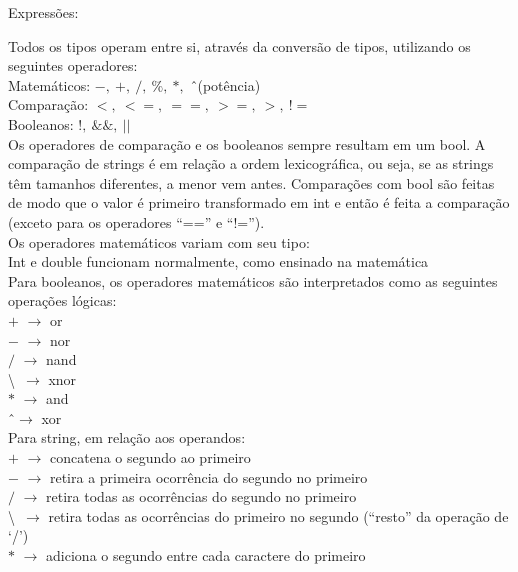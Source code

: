 \documentclass[12pt,a4paper]{article}
\begin{document}
\large{Expressões:}\\[0.1cm]
\normalsize

Todos os tipos operam entre si, através da conversão de tipos, utilizando os seguintes operadores:\\[0.2cm]
Matemáticos: $-,\ +,\ /,\ \%,\ *,$ \^\ (potência)\\
Comparação: $<,\ <=,\ ==,\ >=,\ >,\ !=$\\
Booleanos: $!,\ \&\&,\ ||$\\

Os operadores de comparação e os booleanos sempre resultam em um bool. A comparação de strings é em relação a ordem lexicográfica, ou seja, se as strings têm tamanhos diferentes, a menor vem antes. Comparações com bool são feitas de modo que o valor é primeiro transformado em int e então é feita a comparação (exceto para os operadores ``=='' e ``!='').\\

Os operadores matemáticos variam com seu tipo:\\
Int e double funcionam normalmente, como ensinado na matemática\\

Para booleanos, os operadores matemáticos são interpretados como as seguintes operações lógicas:\\[0.2cm]
$+$ $\rightarrow$ or\\
$-$ $\rightarrow$ nor\\
$/$ $\rightarrow$ nand\\
\textbackslash\ $\rightarrow$ xnor\\
$*$ $\rightarrow$ and\\
\^ \ $\rightarrow$ xor\\

Para string, em relação aos operandos:\\[0.2cm]
$+$ $\rightarrow$ concatena o segundo ao primeiro\\
$-$ $\rightarrow$ retira a primeira ocorrência do segundo no primeiro\\
$/$ $\rightarrow$ retira todas as ocorrências do segundo no primeiro\\
\textbackslash\ $\rightarrow$ retira todas as ocorrências do primeiro no segundo (``resto'' da operação de `/')\\
$*$ $\rightarrow$ adiciona o segundo entre cada caractere do primeiro\\
\end{document}
